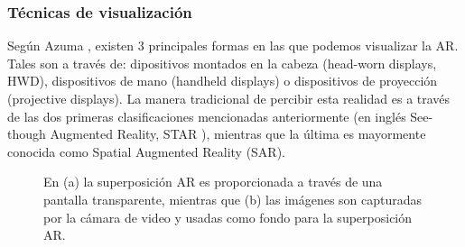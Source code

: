 \documentclass[a4paper,openright,12pt]{report}
\begin{document}
\subsubsection{Técnicas de visualización}
Según Azuma \cite{azuma2001}, existen 3 principales formas en las que podemos visualizar la AR. Tales son a través de: dipositivos montados en la cabeza (head-worn displays, HWD), dispositivos de mano (handheld displays) o dispositivos de proyección (projective displays). La manera tradicional de percibir esta realidad es a través de las dos primeras clasificaciones mencionadas anteriormente (en inglés See-though Augmented Reality, STAR \cite{Sol2016}), mientras que la última es mayormente conocida como Spatial Augmented Reality (SAR).\\
\begin{figure}[thbp]
	\centering
	\caption[Funcionamiento de los HMD's]{En (a) la superposición AR es proporcionada a través de una pantalla transparente, mientras que (b) las imágenes son capturadas por la cámara de video y usadas como fondo para la superposición AR. } \label{fig:opticalvideo}
\end{figure}
\end{document}
